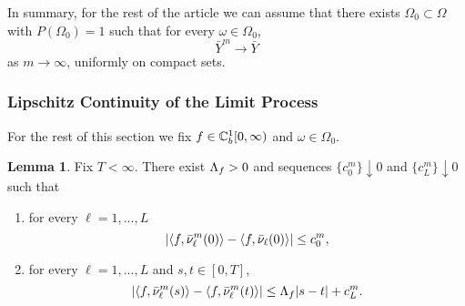 \documentclass{article}
\theoremstyle{definition}
\newtheorem{lemma}[theorem]{Lemma}
\numberwithin{equation}{section}
\begin{document}
In summary, for the rest of the article we can assume that there exists $\Omega_0\subset\Omega$ with $P(\Omega_0)=1$ such that for every $\omega \in \Omega_0$,
\begin{equation}\label{converge}
\bar Y^m \to \bar Y
\end{equation}
as $m\to\infty$, uniformly on compact sets.



\subsubsection{Lipschitz Continuity of the Limit Process}
For the rest of this section we fix $f\in\mathbb{C}_b^{1}[0,\infty)$ and $\omega\in\Omega_0$.
\begin{lemma}\label{lem_preLip}
Fix  $T<\infty$. There exist $\Lambda_f>0$ and sequences $\{c_0^m\}\downarrow0$ and $\{c_L^m\}\downarrow0$ such that
\renewcommand{\theenumi}{\alph{enumi}}
\begin{enumerate}
  \item for every $\ell=1,...,L$
  \begin{equation}\label{preLip1}
    \left| \langle f, \bar{\nu}_\ell^m(0) \rangle - \langle f,\bar{\nu}_\ell(0) \rangle   \right| \leq c_0^m,
  \end{equation}

  \item for every $\ell=1,...,L$ and $s,t\in[0,T]$,
  \begin{equation}\label{preLip2}
    \left| \langle f, \bar{\nu}_\ell^m(s) \rangle -\langle f, \bar{\nu}_\ell^m(t) \rangle \right| \leq \Lambda_f|s-t| + c_L^m.
  \end{equation}

\end{enumerate}

\end{lemma}
\end{document}
